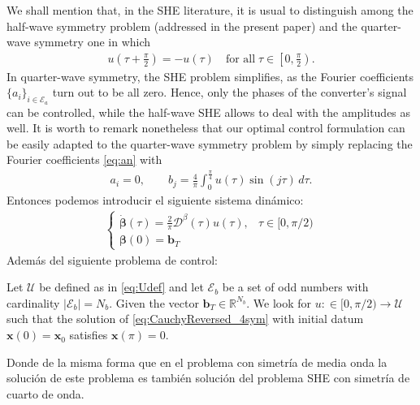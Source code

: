 \vspace{1em}
\begin{remark}
    We shall mention that, in the SHE literature, it is usual to distinguish among the half-wave symmetry problem (addressed in the present paper) and the quarter-wave symmetry one in which
    \begin{align*}
        u\left(\tau + \frac \pi2\right) = -u(\tau)\quad \mbox{for all}\; \tau \in \left[0,\frac \pi2\right).
    \end{align*}
    In quarter-wave symmetry, the SHE problem simplifies, as the Fourier coefficients $\{a_i\}_{i\in\mathcal E_a}$ turn out to be all zero. Hence, only the phases of the converter's signal can be controlled, while the half-wave SHE allows to deal with the amplitudes as well. It is worth to remark nonetheless that our optimal control formulation can be easily adapted to the quarter-wave symmetry problem by simply replacing the Fourier coefficients \eqref{eq:an} with
    \begin{align*}
        a_i = 0, \quad\quad b_j = \frac{4}{\pi} \int_0^{\frac \pi4} u(\tau)  \sin(j \tau)\,d\tau.
    \end{align*}
    Entonces podemos introducir el siguiente sistema dinámico:
    \begin{gather}
        \begin{cases}
            \displaystyle \dot{\bm{\beta}}(\tau) = \frac 2\pi \bm{\mathcal{D}}^\beta(\tau) u(\tau), & \tau \in [0,\pi/2)
            \\[6pt]
            \bm{\beta}(0) = \bm{b}_T
        \end{cases}\label{eq:CauchyReversed_4sym}
    \end{gather}
    Además del siguiente problema de control:
    \vspace{0.5em}
    \begin{problem}\label{pb:SHEpControl_4sym}
        Let $\mathcal{U}$ be defined as in \eqref{eq:Udef} and let $\mathcal{E} _b $ be a set of odd numbers with cardinality $ |\mathcal{E} _b| = N_b$. Given the vector $\bm{b}_T \in \mathbb{R}^{N_b} $. We look for $u:\in [0,\pi/2)\to\mathcal{U}$ such that the solution of \eqref{eq:CauchyReversed_4sym} with initial datum $\bm{x}(0)=\bm{x}_0$ satisfies $\bm{x}(\pi)=0$.
    \end{problem}
    Donde de la misma forma que en el problema con simetría de media onda la solución de este problema es también solución del problema SHE con simetría de cuarto de onda.
\end{remark}


